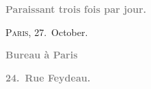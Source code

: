 \pstart
           \begin{otherlanguage}{french}\textcolor{gray}{\textbf{\textbf{Paraissant trois fois par jour.}}}\end{otherlanguage}\hfill \textsc{Paris}, 27. October.\pend
           
\pstart
           \begin{otherlanguage}{french}\textcolor{gray}{\textbf{\textbf{Bureau à Paris}}}\end{otherlanguage}\pend
           
\pstart
           \begin{otherlanguage}{french}\textcolor{gray}{\textbf{\textbf{24. Rue Feydeau.}}}\end{otherlanguage}\pend
           
